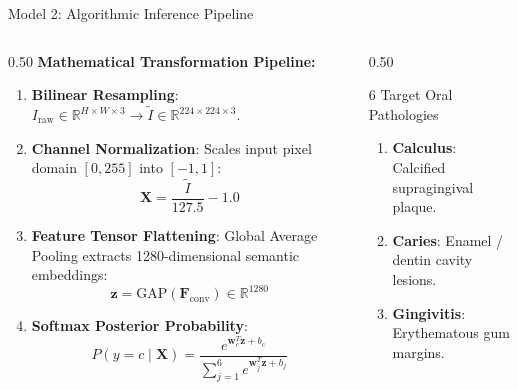 \documentclass[aspectratio=169, 10pt]{beamer}
\begin{document}
\begin{frame}{Model 2: Algorithmic Inference Pipeline}
\begin{columns}[T]
    \begin{column}{0.50\textwidth}
        \textbf{Mathematical Transformation Pipeline:}
        \begin{enumerate}
            \item \textbf{Bilinear Resampling}:
            $I_{\text{raw}} \in \mathbb{R}^{H \times W \times 3} \to \tilde{I} \in \mathbb{R}^{224 \times 224 \times 3}$.
            \item \textbf{Channel Normalization}:
            Scales input pixel domain $[0, 255]$ into $[-1, 1]$:
            \begin{equation*}
                \mathbf{X} = \frac{\tilde{I}}{127.5} - 1.0
            \end{equation*}
            \item \textbf{Feature Tensor Flattening}:
            Global Average Pooling extracts 1280-dimensional semantic embeddings:
            \begin{equation*}
                \mathbf{z} = \text{GAP}(\mathbf{F}_{\text{conv}}) \in \mathbb{R}^{1280}
            \end{equation*}
            \item \textbf{Softmax Posterior Probability}:
            \begin{equation*}
                P(y = c \mid \mathbf{X}) = \frac{e^{\mathbf{w}_c^T \mathbf{z} + b_c}}{\sum_{j=1}^6 e^{\mathbf{w}_j^T \mathbf{z} + b_j}}
            \end{equation*}
        \end{enumerate}
    \end{column}
    \begin{column}{0.50\textwidth}
        \begin{block}{6 Target Oral Pathologies}
            \footnotesize
            \begin{enumerate}
                \item \textbf{Calculus}: Calcified supragingival plaque.
                \item \textbf{Caries}: Enamel / dentin cavity lesions.
                \item \textbf{Gingivitis}: Erythematous gum margins.

\end{enumerate}
\end{block}
\end{column}
\end{columns}
\end{frame}
\end{document}
